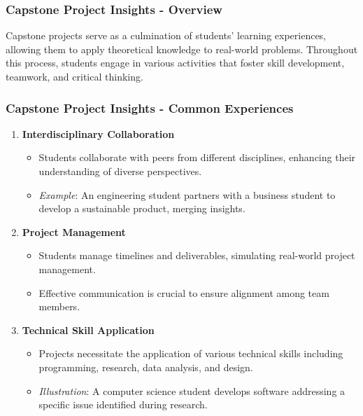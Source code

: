 \documentclass{beamer}
\begin{document}
\begin{frame}[fragile]
    \frametitle{Capstone Project Insights - Overview}
    Capstone projects serve as a culmination of students' learning experiences, allowing them to apply theoretical knowledge to real-world problems. Throughout this process, students engage in various activities that foster skill development, teamwork, and critical thinking.
\end{frame}

\begin{frame}[fragile]
    \frametitle{Capstone Project Insights - Common Experiences}
    \begin{enumerate}
        \item \textbf{Interdisciplinary Collaboration}
            \begin{itemize}
                \item Students collaborate with peers from different disciplines, enhancing their understanding of diverse perspectives.
                \item \textit{Example}: An engineering student partners with a business student to develop a sustainable product, merging insights.
            \end{itemize}
        
        \item \textbf{Project Management}
            \begin{itemize}
                \item Students manage timelines and deliverables, simulating real-world project management.
                \item Effective communication is crucial to ensure alignment among team members.
            \end{itemize}

        \item \textbf{Technical Skill Application}
            \begin{itemize}
                \item Projects necessitate the application of various technical skills including programming, research, data analysis, and design.
                \item \textit{Illustration}: A computer science student develops software addressing a specific issue identified during research.
            \end{itemize}
    \end{enumerate}
\end{frame}
\end{document}
